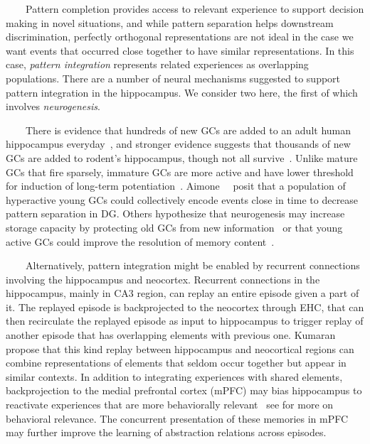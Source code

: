 \begin{center}
\begin{tcolorbox}[breakable,sharp corners=all,coltitle=black,colbacktitle=white,
    width=\textwidth,boxsep=5pt,left=5pt,right=5pt,
    title={\textbf{Box A: Pattern Separation, Completion and Integration}}]
~~~~Pattern completion provides access to relevant experience to support decision making in novel situations, and while pattern separation helps downstream discrimination, perfectly orthogonal representations are not ideal in the case we want events that occurred close together to have similar representations. In this case, {\it{pattern integration}} represents related experiences as overlapping populations. There are a number of neural mechanisms suggested to support pattern integration in the hippocampus. We consider two here, the first of which involves {\it{neurogenesis}}. 

~~~~There is evidence that hundreds of new GCs are added to an adult human hippocampus everyday~\cite{SpaldingetalCELL-13}, and stronger evidence suggests that thousands of new GCs are added to rodent’s hippocampus, though not all survive~\cite{KitabatakeetalNCNM-07}. Unlike mature GCs that fire sparsely, immature GCs are more active and have lower threshold for induction of long-term potentiation~\cite{AimoneetalNEURON-09,GeetalNATURE-06,Schmidt-HieberetalNATURE-04}. Aimone~\etal{}~\cite{AimoneetalNEURON-09} posit that a population of hyperactive young GCs could collectively encode events close in time to decrease pattern separation in DG. Others hypothesize that neurogenesis may increase storage capacity by protecting old GCs from new information~\cite{BeckerHIPPOCAMPUS-05,WiskottetalHIPPOCAMPUS-06} or that young active GCs could improve the resolution of memory content~\cite{AimoneetalNEURON-11}. 

~~~~Alternatively, pattern integration might be enabled by recurrent connections involving the hippocampus and neocortex. Recurrent connections in the hippocampus, mainly in CA3 region, can replay an entire episode given a part of it. The replayed episode is backprojected to the neocortex through EHC, that can then recirculate the replayed episode as input to hippocampus to trigger replay of another episode that has overlapping elements with previous one. Kumaran~\etal{}~\cite{KumaranetalTiCS-16} propose that this kind replay between hippocampus and neocortical regions can combine representations of elements that seldom occur together but appear in similar contexts. In addition to integrating experiences with shared elements, backprojection to the medial prefrontal cortex (mPFC) may bias hippocampus to reactivate experiences that are more behaviorally relevant~\cite{SchlichtingandPrestonCOiBS} {\emdash{}} see {} for more on behavioral relevance. The concurrent presentation of these memories in mPFC may further improve the learning of abstraction relations across episodes.

  \end{tcolorbox}
\end{center}

